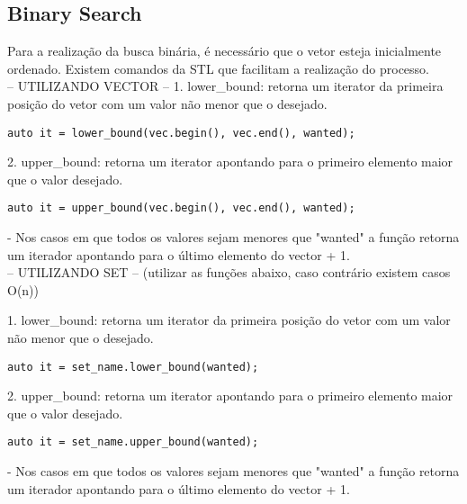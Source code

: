\subsection{Binary Search}
Para a realização da busca binária, é necessário que o vetor esteja inicialmente ordenado. Existem comandos da STL que facilitam a realização do processo.\\

-- UTILIZANDO VECTOR --
1. lower\_bound: retorna um iterator da primeira posição do vetor com um valor não menor que o desejado.
\begin{verbatim}
auto it = lower_bound(vec.begin(), vec.end(), wanted);
\end{verbatim}

2. upper\_bound: retorna um iterator apontando para o primeiro elemento maior que o valor desejado.
\begin{verbatim}
auto it = upper_bound(vec.begin(), vec.end(), wanted);
\end{verbatim}
- Nos casos em que todos os valores sejam menores que "wanted" a função retorna um iterador apontando para o último elemento do vector + 1.\\

-- UTILIZANDO SET -- (utilizar as funções abaixo, caso contrário existem casos O(n))

1. lower\_bound: retorna um iterator da primeira posição do vetor com um valor não menor que o desejado.
\begin{verbatim}
auto it = set_name.lower_bound(wanted);
\end{verbatim}

2. upper\_bound: retorna um iterator apontando para o primeiro elemento maior que o valor desejado.
\begin{verbatim}
auto it = set_name.upper_bound(wanted);
\end{verbatim}
- Nos casos em que todos os valores sejam menores que "wanted" a função retorna um iterador apontando para o último elemento do vector + 1.


